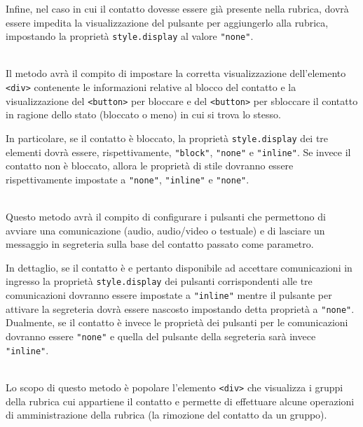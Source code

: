 \begin{description}
  Infine, nel caso in cui il contatto dovesse essere già presente nella rubrica, dovrà essere impedita la visualizzazione del pulsante per aggiungerlo alla rubrica, impostando la proprietà \verb'style.display' al valore \verb'"none"'.

  \item{}\\
  Il metodo avrà il compito di impostare la corretta visualizzazione dell'elemento \verb'<div>' contenente le informazioni relative al blocco del contatto e la visualizzazione del \verb'<button>' per bloccare e del \verb'<button>' per sbloccare il contatto in ragione dello stato (bloccato o meno) in cui si trova lo stesso.
  
  In particolare, se il contatto è bloccato, la proprietà \verb'style.display' dei tre elementi dovrà essere, rispettivamente, \verb'"block"', \verb'"none"' e \verb'"inline"'. Se invece il contatto non è bloccato, allora le proprietà di stile dovranno essere rispettivamente impostate a \verb'"none"', \verb'"inline"' e \verb'"none"'.
  
  \item{}\\
  Questo metodo avrà il compito di configurare i pulsanti che permettono di avviare una comunicazione (audio, audio/video o testuale) e di lasciare un messaggio in segreteria sulla base del contatto passato come parametro.
  
  In dettaglio, se il contatto è  e pertanto disponibile ad accettare comunicazioni in ingresso la proprietà \verb'style.display' dei pulsanti corrispondenti alle tre comunicazioni dovranno essere impostate a \verb'"inline"' mentre il pulsante per attivare la segreteria dovrà essere nascosto impostando detta proprietà a \verb'"none"'. Dualmente, se il contatto è invece  le proprietà dei pulsanti per le comunicazioni dovranno essere \verb'"none"' e quella del pulsante della segreteria sarà invece \verb'"inline"'.
  
  \item{}\\
  Lo scopo di questo metodo è popolare l'elemento \verb'<div>' che visualizza i gruppi della rubrica cui appartiene il contatto e permette di effettuare alcune operazioni di amministrazione della rubrica (la rimozione del contatto da un gruppo).
  

\end{description}
